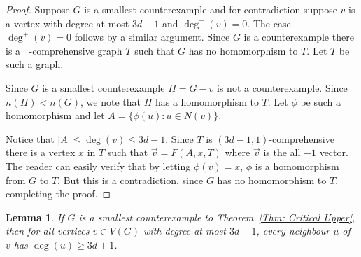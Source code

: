 \documentclass[11pt]{article}
\newtheorem{lemma}[theorem]{Lemma}
\theoremstyle{definition}
\DeclareMathOperator{\coe}{6\Big(1+\frac{9d^2}{4}\Big)^{\frac{1}{2}}d}
\DeclareMathOperator{\bound}{\Big( 3d-1, \coe\sqrt{n}\Big)}
\begin{document}
\begin{proof}
    Suppose $G$ is a smallest counterexample and
    for contradiction suppose $v$ is a vertex with degree at most $3d-1$ and $\deg^-(v) = 0$.
    The case $\deg^+(v) = 0$ follows by a similar argument.
    Since $G$ is a counterexample there is a $\bound$-comprehensive graph $T$ such that
    $G$ has no homomorphism to $T$.
    Let $T$ be such a graph.

    Since $G$ is a smallest counterexample $H = G -v$ is not a counterexample.
    Since $n(H)< n(G)$, we note that $H$ has a homomorphism to $T$.
    Let $\phi$ be such a homomorphism
    and let $A = \{\phi(u): u \in N(v)\}$.

    Notice that $|A|\leq \deg(v)\leq 3d-1$.
    Since $T$ is $(3d-1,1)$-comprehensive there is a vertex $x$ in $T$
    such that $\vec{v} = F(A,x,T)$ where $\vec{v}$ is the all $-1$ vector.
    The reader can easily verify that by letting $\phi(v)=x$, $\phi$ is a homomorphism from $G$ to $T$.
    But this is a contradiction, since $G$ has no homomorphism to $T$, completing the proof.
\end{proof}



\begin{lemma}\label{Lemma: counter-low-neighbours}
    If $G$ is a smallest counterexample to Theorem~\ref{Thm: Critical Upper},
    then for all vertices $v \in V(G)$ with degree at most $3d-1$,
    every neighbour $u$ of $v$ has $\deg(u)\geq 3d+1$.
\end{lemma}
\end{document}
